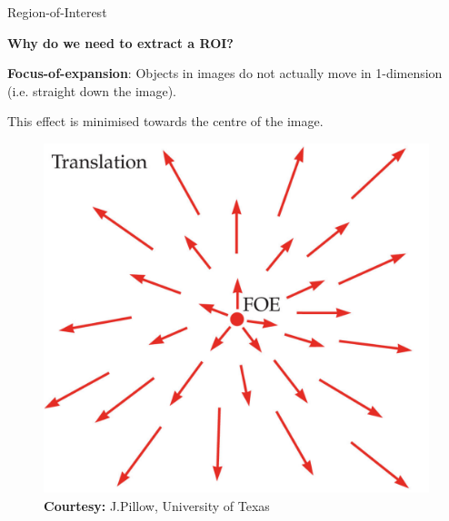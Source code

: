 \documentclass[10pt, compress]{beamer}
\begin{document}
\begin{frame}{Region-of-Interest}

\textbf{Why do we need to extract a ROI?} \\ \vspace{0.5cm}

\textbf{Focus-of-expansion}: Objects in images do not actually move in 1-dimension (i.e. straight down the image). \\ \vspace{0.2cm}

This effect is minimised towards the centre of the image.

\begin{figure}[ht!]
\centering
\includegraphics[scale=0.15]{foe.png}
\caption{\textbf{Courtesy:} J.Pillow, University of Texas}
  \end{figure}
  
\end{frame}
\end{document}
